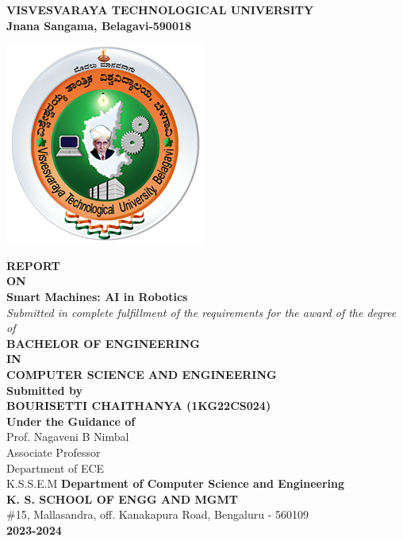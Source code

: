 \thispagestyle{empty}
\setcounter{page}{1}
\begin{center}
  \textbf{\Large VISVESVARAYA TECHNOLOGICAL UNIVERSITY} \\
  \textbf{\small Jnana Sangama, Belagavi-590018} \\
  \vspace{.3cm}  
  \centerline{\includegraphics[scale=.2]{logo.png}} 
  \vspace{0.5cm}
  \textbf{\Large REPORT} \\
  \vspace{.3cm}
  \textbf{\large ON} \\
  \vspace{.3cm}
  \textbf{\Large Smart Machines: AI in Robotics } \\
  \vspace{.7cm}
  \textit{Submitted in complete fulfillment of the requirements for the award of the degree of} \\
  \vspace{0.2cm}
  \textbf{\large BACHELOR OF ENGINEERING} \\
  \vspace{0.3cm}
  \textbf{\large IN} \\
  \vspace{0.3cm}
  \textbf{\large COMPUTER SCIENCE AND ENGINEERING} \\
  \vspace{.7cm}
  \textbf{Submitted by} \\
  \vspace{0.2cm}
  \textbf{\Large BOURISETTI CHAITHANYA (1KG22CS024)} \\
  \vspace{.7cm}
  \textbf{Under the Guidance of} \\
  \vspace{0.2cm}
  {\large Prof. Nagaveni B Nimbal} \\
  {\small Associate Professor} \\
  {\small Department of ECE}   \\
  {K.S.S.E.M}
  \vspace{.7cm}
  \textbf{\large Department of Computer Science and Engineering} \\
  \textbf{\large K. S. SCHOOL OF ENGG AND MGMT} \\
  \#15, Mallasandra, off. Kanakapura Road, Bengaluru - 560109 \\
  \vspace{0.2cm}
  \textbf{2023-2024}
\end{center}